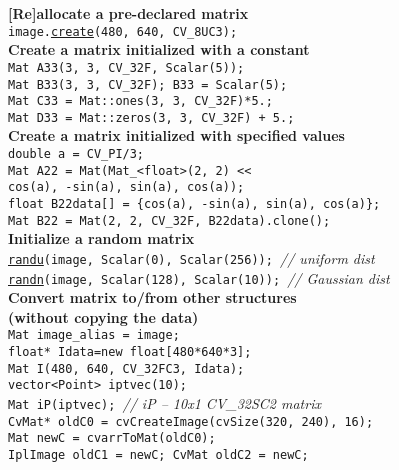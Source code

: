 \documentclass[10pt,landscape]{article}
\begin{document}
\begin{multicols}{3}
\begin{tabbing}
\textbf{[Re]allocate a pre-declared matrix}\\
\> \texttt{image.\href{http://opencv.willowgarage.com/documentation/cpp/basic_structures.html\#Mat::create}{create}(480, 640, CV\_8UC3);}\\

\textbf{Create a matrix initialized with a constant}\\
\> \texttt{Mat A33(3, 3, CV\_32F, Scalar(5));} \\
\> \texttt{Mat B33(3, 3, CV\_32F); B33 = Scalar(5);} \\
\> \texttt{Mat C33 = Mat::ones(3, 3, CV\_32F)*5.;} \\
\> \texttt{Mat D33 = Mat::zeros(3, 3, CV\_32F) + 5.;} \\

\textbf{Create a matrix initialized with specified values}\\
\> \texttt{double a = CV\_PI/3;} \\
\> \texttt{Mat A22 = Mat(Mat\_<float>(2, 2) <<} \\
\> \> \texttt{cos(a), -sin(a), sin(a), cos(a));} \\
\> \texttt{float B22data[] = \{cos(a), -sin(a), sin(a), cos(a)\};} \\
\> \texttt{Mat B22 = Mat(2, 2, CV\_32F, B22data).clone();}\\

\textbf{Initialize a random matrix}\\
\> \texttt{\href{http://opencv.willowgarage.com/documentation/cpp/operations_on_arrays.html\#cv-randu}{randu}(image, Scalar(0), Scalar(256)); }\textit{// uniform dist}\\
\> \texttt{\href{http://opencv.willowgarage.com/documentation/cpp/operations_on_arrays.html\#cv-randn}{randn}(image, Scalar(128), Scalar(10)); }\textit{// Gaussian dist}\\

\textbf{Convert matrix to/from other structures}\\
\>\textbf{(without copying the data)}\\
\> \texttt{Mat image\_alias = image;}\\
\> \texttt{float* Idata=new float[480*640*3];}\\
\> \texttt{Mat I(480, 640, CV\_32FC3, Idata);}\\
\> \texttt{vector<Point> iptvec(10);}\\
\> \texttt{Mat iP(iptvec); }\textit{// iP -- 10x1 CV\_32SC2 matrix}\\
\> \texttt{CvMat* oldC0 = cvCreateImage(cvSize(320, 240), 16);}\\
\> \texttt{Mat newC = cvarrToMat(oldC0);}\\
\> \texttt{IplImage oldC1 = newC; CvMat oldC2 = newC;}\\


\end{tabbing}
\end{multicols}
\end{document}
